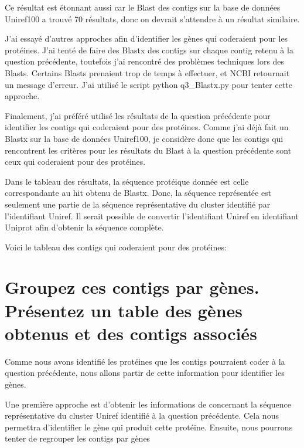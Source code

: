 \documentclass[10.9pt]{article} %
\begin{document}
Ce résultat est étonnant aussi car le Blast des contigs sur la base de données Uniref100 a trouvé 70 résultats, donc
on devrait s'attendre à un résultat similaire. 

J'ai essayé d'autres approches afin d'identifier les gènes qui coderaient pour les protéines. J'ai tenté de faire des
Blastx des contigs sur chaque contig retenu à la question précédente, toutefois j'ai rencontré des problèmes techniques
lors des Blasts. Certains Blasts prenaient trop de temps à effectuer, et NCBI retournait un message d'erreur.
J'ai utilisé le script python q3\_Blastx.py pour tenter cette approche.

Finalement, j'ai préféré utilisé les résultats de la question précédente pour identifier les contigs qui coderaient
pour des protéines. Comme j'ai déjà fait un Blastx sur la base de données Uniref100, je considère donc que les contigs
qui rencontrent les critères pour les résultats du Blast à la question précédente sont ceux qui coderaient pour des
protéines.

Dans le tableau des résultats, la séquence protéique donnée est celle correspondante au hit obtenu de Blastx. Donc, 
la séquence représentée est seulement une partie de la séquence représentative du cluster identifié par l'identifiant
Uniref. Il serait possible de convertir l'identifiant Uniref en identifiant Uniprot afin d'obtenir la séquence complète.


Voici le tableau des contigs qui coderaient pour des protéines:






\section{Groupez ces contigs par gènes. Présentez un table des gènes obtenus et des contigs
associés} %

Comme nous avons identifié les protéines que les contigs pourraient coder à la question 
précédente, nous allons partir de cette information pour identifier les gènes.

Une première approche est d'obtenir les informations de concernant la séquence représentative
du cluster Uniref identifié à la question précédente. Cela nous permettra d'identifier le
gène qui produit cette protéine. Ensuite, nous pourrons tenter de regrouper les contigs
par gènes
\end{document}
